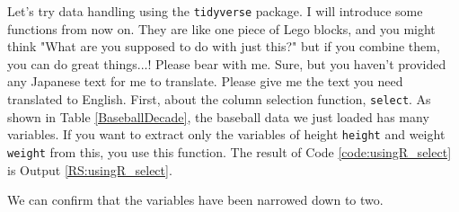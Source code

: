 \documentclass{ltjsbook}
\begin{document}
Let's try data handling using the \verb|tidyverse| package.
I will introduce some functions from now on. They are like one piece of Lego blocks, and you might think "What are you supposed to do with just this?" but if you combine them, you can do great things...! Please bear with me.
Sure, but you haven't provided any Japanese text for me to translate. Please give me the text you need translated to English.
First, about the column selection function, \verb|select|. As shown in Table \ref{BaseballDecade}, the baseball data we just loaded has many variables. If you want to extract only the variables of height \verb|height| and weight \verb|weight| from this, you use this function.
The result of Code \ref{code:usingR_select} is Output \ref{RS:usingR_select}.


We can confirm that the variables have been narrowed down to two.
\end{document}
